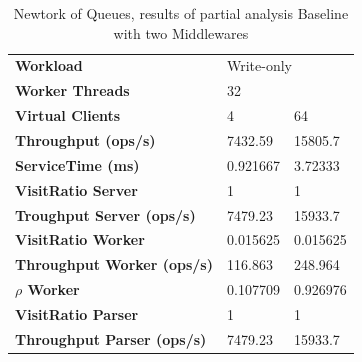 \documentclass[11pt,a4paper]{article}
\begin{document}
\begin{table}[!htb]
\centering
    \caption{Newtork of Queues, results of partial analysis Baseline with two Middlewares}
\begin{tabular}{lll}
\toprule
\textbf{Workload} & \multicolumn{2}{l}{Write-only} \\
\textbf{Worker Threads} & \multicolumn{2}{l}{32} \\
\textbf{Virtual Clients} &        4  &        64 \\
\midrule
    \textbf{Throughput (ops/s)}             &   7432.59 &   15805.7 \\
    \textbf{ServiceTime (ms)}               &  0.921667 &   3.72333 \\                  
    \textbf{VisitRatio Server}              &         1 &         1 \\                 
    \textbf{Troughput Server (ops/s)}       &   7479.23 &   15933.7 \\           
    \textbf{VisitRatio Worker}              &  0.015625 &  0.015625 \\                        
    \textbf{Throughput Worker (ops/s)}      &   116.863 &   248.964 \\
    \textbf{$\rho$ Worker}                  &  0.107709 &  0.926976 \\
    \textbf{VisitRatio Parser}              &         1 &         1 \\
    \textbf{Throughput Parser (ops/s)}      &   7479.23 &   15933.7 \\
\bottomrule
\end{tabular}
\end{table}
\end{document}

